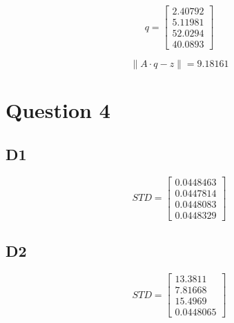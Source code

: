 \begin{equation}
q=\begin{bmatrix} 2.40792 \\ 5.11981 \\ 52.0294 \\ 40.0893  \end{bmatrix}
\label{eq:} 
\end{equation}

\begin{equation}
\left\| A\cdot q-z \right\| = 9.18161
\label{eq:} 
\end{equation}





\section*{Question 4}
\subsection*{D1}
\begin{equation}
STD=\begin{bmatrix} 0.0448463 \\ 0.0447814 \\ 0.0448083 \\ 0.0448329  \end{bmatrix}
\label{eq:} 
\end{equation}


\subsection*{D2}
\begin{equation}
STD=\begin{bmatrix} 13.3811 \\ 7.81668 \\ 15.4969 \\ 0.0448065  \end{bmatrix}
\label{eq:} 
\end{equation}


